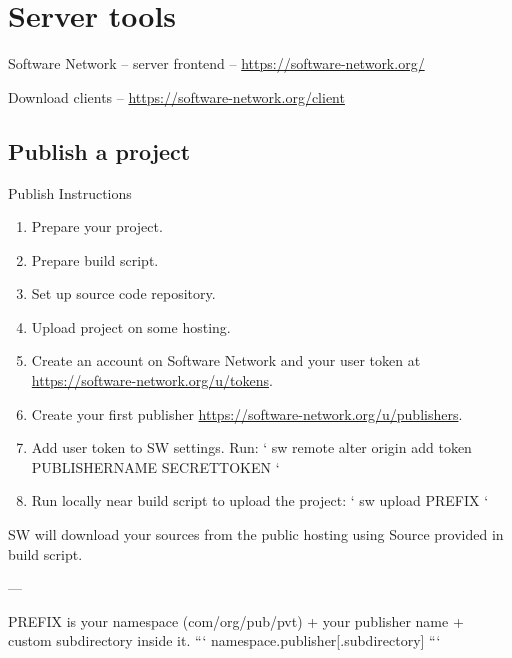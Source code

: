 

\chapter{Server tools}

Software Network -- server frontend --
\url{https://software-network.org/}

Download clients -- \url{https://software-network.org/client}

\section{Publish a project}

Publish Instructions

\begin{enumerate}

\item
Prepare your project.

\item
Prepare build script.

\item
Set up source code repository.

\item
Upload project on some hosting.

\item

Create an account on Software Network and your user token at\\ \url{https://software-network.org/u/tokens}.

\item
Create your first publisher \url{https://software-network.org/u/publishers}.

\item
Add user token to SW settings. Run:
`
sw remote alter origin add token PUBLISHERNAME SECRETTOKEN
`

\item
Run locally near build script to upload the project:
`
sw upload PREFIX
`

\end{enumerate}


SW will download your sources from the public hosting using Source provided in build script.

---

PREFIX is your namespace (com/org/pub/pvt) + your publisher name + custom subdirectory inside it.
```
namespace.publisher[.subdirectory]
```

